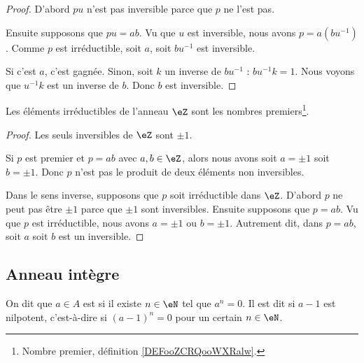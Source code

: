 \begin{proof}
	D'abord \( pu\) n'est pas inversible parce que \( p\) ne l'est pas.

	Ensuite supposons que \( pu=ab\). Vu que \( u\) est inversible, nous avons \( p=a(bu^{-1})\). Comme \( p\) est irréductible, soit \( a\), soit \( bu^{-1}\) est inversible.

	Si c'est \( a\), c'est gagnée. Sinon, soit \( k\) un inverse de \( bu^{-1}\) : \( bu^{-1}k=1\). Nous voyons que \( u^{-1}k\) est un inverse de \( b\). Donc \( b\) est inversible.
\end{proof}

\begin{proposition}     \label{PROPooKDWQooTtScrN}
	Les éléments irréductibles de l'anneau \( \eZ\) sont les nombres premiers\footnote{Nombre premier, définition \ref{DEFooZCRQooWXRalw}.}.
\end{proposition}

\begin{proof}
	Les seuls inversibles de \( \eZ\) sont \( \pm 1\).

	Si \( p\) est premier et \( p=ab\) avec \( a,b\in \eZ\), alors nous avons soit \( a=\pm 1\) soit \( b=\pm 1\). Donc \( p\) n'est pas le produit de deux éléments non inversibles.

	Dans le sens inverse, supposons que \( p\) soit irréductible dans \( \eZ\). D'abord \( p\) ne peut pas être \( \pm 1\) parce que \( \pm 1\) sont inversibles. Ensuite supposons que \( p=ab\). Vu que \( p\) est irréductible, nous avons \( a=\pm1\) ou \( b=\pm1\). Autrement dit, dans \( p=ab\), soit \( a\) soit \( b\) est un inversible.
\end{proof}

\subsection{Anneau intègre}

\begin{definition}  \label{DEFooHRRYooTmbUTH}
	On dit que \( a \in A \) est  si il existe \( n \in \eN \) tel que \( a^n = 0 \). Il est dit  si \( a-1\) est nilpotent, c'est-à-dire si \( (a-1)^n =0\) pour un certain \( n \in \eN \).
\end{definition}

